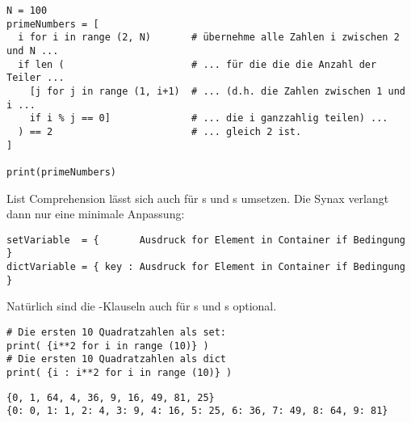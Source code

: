 \begin{codebox}
\begin{verbatim}
N = 100
primeNumbers = [
  i for i in range (2, N)       # übernehme alle Zahlen i zwischen 2 und N ...
  if len (                      # ... für die die die Anzahl der Teiler ...
    [j for j in range (1, i+1)  # ... (d.h. die Zahlen zwischen 1 und i ...
    if i % j == 0]              # ... die i ganzzahlig teilen) ...
  ) == 2                        # ... gleich 2 ist.
]

print(primeNumbers)
\end{verbatim}
\end{codebox}

\begin{cmdbox}
\end{cmdbox}


List Comprehension lässt sich auch für s und s umsetzen. Die Synax verlangt dann nur eine minimale Anpassung:
\begin{codebox}
\begin{verbatim}
setVariable  = {       Ausdruck for Element in Container if Bedingung }
dictVariable = { key : Ausdruck for Element in Container if Bedingung }
\end{verbatim}
\end{codebox}
Natürlich sind die -Klauseln auch für s und s optional.

\begin{codebox}
\begin{verbatim}
# Die ersten 10 Quadratzahlen als set:
print( {i**2 for i in range (10)} )
# Die ersten 10 Quadratzahlen als dict
print( {i : i**2 for i in range (10)} )
\end{verbatim}
\end{codebox}

\begin{cmdbox}
\begin{verbatim}
{0, 1, 64, 4, 36, 9, 16, 49, 81, 25}
{0: 0, 1: 1, 2: 4, 3: 9, 4: 16, 5: 25, 6: 36, 7: 49, 8: 64, 9: 81}
\end{verbatim}
\end{cmdbox}


